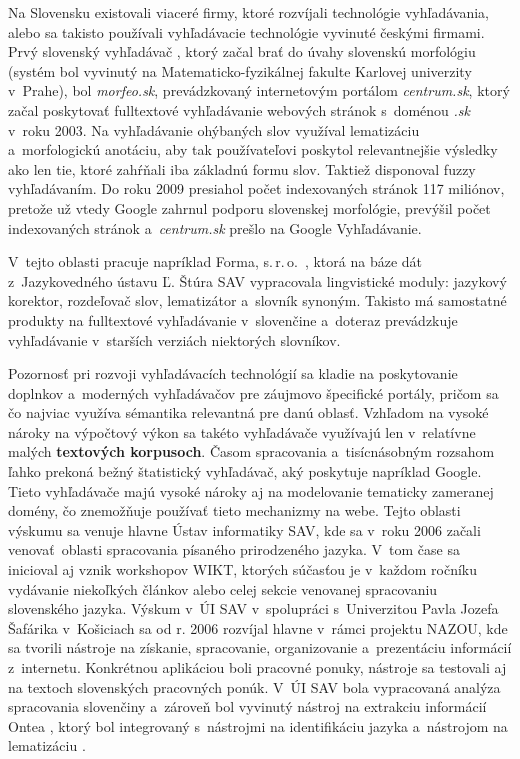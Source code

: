 \begin{multicols}{2}
Na Slovensku existovali viaceré firmy, ktoré rozvíjali
technológie vyhľadávania, alebo sa takisto používali vyhľadávacie technológie
vyvinuté českými firmami. Prvý slovenský vyhľadávač , ktorý začal brať
do úvahy slovenskú morfológiu (systém bol vyvinutý na Matematicko-fyzikálnej
fakulte Karlovej univerzity v~Prahe), bol \emph{morfeo.sk}, prevádzkovaný
internetovým portálom \emph{centrum.sk}, ktorý začal poskytovať fulltextové
vyhľadávanie webových stránok s~doménou \emph{.sk} v~roku 2003. Na vyhľadávanie
ohýbaných slov využíval lematizáciu a~morfologickú anotáciu, aby tak
používateľovi poskytol relevantnejšie výsledky ako len tie, ktoré zahŕňali iba
základnú formu slov. Taktiež disponoval fuzzy vyhľadávaním. Do roku 2009 presiahol počet
indexovaných stránok 117 miliónov, pretože už vtedy Google zahrnul podporu
slovenskej morfológie, prevýšil počet indexovaných stránok a~\emph{centrum.sk}
prešlo na Google Vyhľadávanie.

V~tejto oblasti pracuje napríklad Forma, s.\,r.\,o.~\cite{f25}, ktorá na báze dát z~Jazykovedného ústavu Ľ. Štúra SAV vypracovala lingvistické moduly: jazykový korektor, rozdeľovač slov, lematizátor a~slovník synoným. Takisto má samostatné produkty na fulltextové vyhľadávanie v~slovenčine a~doteraz prevádzkuje vyhľadávanie v~starších verziách niektorých slovníkov.

Pozornosť pri rozvoji vyhľadávacích technológií sa kladie na poskytovanie doplnkov a~moderných vyhľadávačov pre záujmovo špecifické portály, pričom sa čo najviac využíva sémantika relevantná pre danú oblasť. Vzhľadom na vysoké nároky na výpočtový výkon sa takéto vyhľadávače využívajú len v~relatívne malých \textbf{textových korpusoch}. Časom spracovania a~tisícnásobným rozsahom ľahko prekoná bežný štatistický vyhľadávač, aký poskytuje napríklad Google. Tieto vyhľadávače majú vysoké nároky aj na modelovanie tematicky zameranej domény, čo znemožňuje používať tieto mechanizmy na webe. 
Tejto oblasti výskumu sa venuje hlavne Ústav informatiky SAV, kde sa v~roku 2006 začali venovať~oblasti spracovania písaného prirodzeného jazyka. V~tom čase sa inicioval aj vznik workshopov WIKT\cite{f26}, ktorých súčasťou je v~každom ročníku vydávanie niekoľkých článkov alebo celej sekcie venovanej spracovaniu slovenského jazyka. Výskum v~ÚI SAV v~spolupráci s~Univerzitou Pavla Jozefa Šafárika v~Košiciach sa od r. 2006 rozvíjal hlavne v~rámci projektu NAZOU\cite{f27}, kde sa tvorili nástroje na získanie, spracovanie, organizovanie a~prezentáciu informácií z~internetu. Konkrétnou aplikáciou boli pracovné ponuky, nástroje sa testovali aj na textoch slovenských pracovných ponúk. V~ÚI SAV bola vypracovaná analýza spracovania slovenčiny \cite{laclavik2007a} a~zároveň bol vyvinutý nástroj na extrakciu informácií Ontea\cite{f28} \cite{laclavik2007b,laclavik2009}, ktorý bol integrovaný s~nástrojmi na identifikáciu jazyka \cite{vojtek2006} a~nástrojom na lematizáciu \cite{krajci2007}.


\end{multicols}
